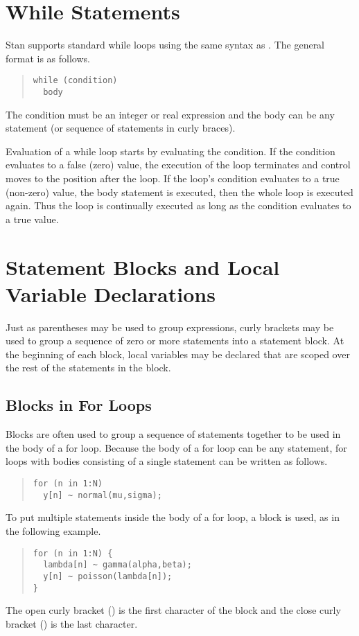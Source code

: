 \section{While Statements}

Stan supports standard while loops using the same syntax as \Cpp.  The
general format is as follows.
%
\begin{quote}
\begin{Verbatim}
while (condition)
  body
\end{Verbatim}
\end{quote}
%
The condition must be an integer or real expression and the body can
be any statement (or sequence of statements in curly braces).  

Evaluation of a while loop starts by evaluating the condition.  If the
condition evaluates to a false (zero) value, the execution of the loop
terminates and control moves to the position after the loop.  If the
loop's condition evaluates to a true (non-zero) value, the body statement is
executed, then the whole loop is executed again.  Thus the loop is
continually executed as long as the condition evaluates to a true value.


\section{Statement Blocks and Local Variable Declarations}

Just as parentheses may be used to group expressions, curly brackets
may be used to group a sequence of zero or more statements into a
statement block.  At the beginning of each block, local variables may be
declared that are scoped over the rest of the statements in the block.

\subsection{Blocks in For Loops}

Blocks are often used to group a sequence of statements together to be
used in the body of a for loop.  Because the body of a for loop can be
any statement, for loops with bodies consisting of a single statement
can be written as follows.
%
\begin{quote}
\begin{Verbatim} 
for (n in 1:N) 
  y[n] ~ normal(mu,sigma);
\end{Verbatim}
\end{quote}
% 
To put multiple statements inside the body of a for loop, a block is
used, as in the following example.
%
\begin{quote}
\begin{Verbatim}
for (n in 1:N) {
  lambda[n] ~ gamma(alpha,beta);
  y[n] ~ poisson(lambda[n]);
}
\end{Verbatim}
\end{quote}
%
The open curly bracket (\code{\{}) is the first character of the block
and the close curly bracket (\code{\}}) is the last character.

